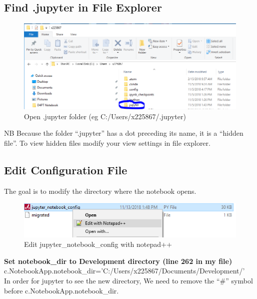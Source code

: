 \documentclass{report}
\begin{document}
\subsection*{Find .jupyter in File Explorer}

\begin{figure}[H]
\centering
\includegraphics{./images/jupyter_configuration_file.PNG}
\caption{Open .jupyter folder (eg C:/Users/x225867/.jupyter)}
\end{figure}

NB Because the folder ``.jupyter'' has a dot preceding its name, it is a ``hidden file''. To view hidden files modify your view settings in file explorer.


\subsection*{Edit Configuration File}

The goal is to modify the directory where the notebook opens. 

\begin{figure}[H]
\centering
\includegraphics{./images/jupyter_configuration_edit.PNG}
\caption{Edit jupyter\_notebook\_config with notepad++}
\end{figure}

\textbf{Set notebook\_dir to Development directory (line 262 in my file)}\\
c.NotebookApp.notebook\_dir='C:/Users/x225867/Documents/Development/'\\

In order for jupyter to see the new directory, We need to remove the ``\#'' symbol before c.NotebookApp.notebook\_dir.
\end{document}
